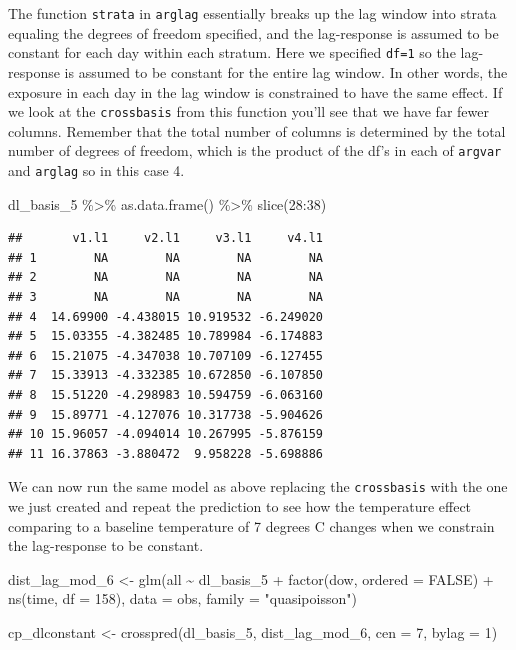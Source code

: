 \documentclass[
]{book}
\newenvironment{Shaded}{\begin{snugshade}}{\end{snugshade}}
\newcommand{\AttributeTok}[1]{\textcolor[rgb]{0.77,0.63,0.00}{#1}}
\newcommand{\ConstantTok}[1]{\textcolor[rgb]{0.00,0.00,0.00}{#1}}
\newcommand{\DecValTok}[1]{\textcolor[rgb]{0.00,0.00,0.81}{#1}}
\newcommand{\FunctionTok}[1]{\textcolor[rgb]{0.00,0.00,0.00}{#1}}
\newcommand{\NormalTok}[1]{#1}
\newcommand{\OtherTok}[1]{\textcolor[rgb]{0.56,0.35,0.01}{#1}}
\newcommand{\SpecialCharTok}[1]{\textcolor[rgb]{0.00,0.00,0.00}{#1}}
\newcommand{\StringTok}[1]{\textcolor[rgb]{0.31,0.60,0.02}{#1}}
\begin{document}
The function \texttt{strata} in \texttt{arglag} essentially breaks up the lag window into strata equaling the degrees of freedom specified, and the lag-response is assumed to be constant for each day within each stratum. Here we specified \texttt{df=1} so the lag-response is assumed to be constant for the entire lag window. In other words, the exposure in each day in the lag window is constrained to have the same effect. If we look at the \texttt{crossbasis} from this function you'll see that we have far fewer columns. Remember that the total number of columns is determined by the total number of degrees of freedom, which is the product of the df's in each of \texttt{argvar} and \texttt{arglag} so in this case 4.

\begin{Shaded}
\begin{Highlighting}[]
\NormalTok{dl\_basis\_5 }\SpecialCharTok{\%\textgreater{}\%} 
  \FunctionTok{as.data.frame}\NormalTok{() }\SpecialCharTok{\%\textgreater{}\%} 
  \FunctionTok{slice}\NormalTok{(}\DecValTok{28}\SpecialCharTok{:}\DecValTok{38}\NormalTok{)}
\end{Highlighting}
\end{Shaded}

\begin{verbatim}
##       v1.l1     v2.l1     v3.l1     v4.l1
## 1        NA        NA        NA        NA
## 2        NA        NA        NA        NA
## 3        NA        NA        NA        NA
## 4  14.69900 -4.438015 10.919532 -6.249020
## 5  15.03355 -4.382485 10.789984 -6.174883
## 6  15.21075 -4.347038 10.707109 -6.127455
## 7  15.33913 -4.332385 10.672850 -6.107850
## 8  15.51220 -4.298983 10.594759 -6.063160
## 9  15.89771 -4.127076 10.317738 -5.904626
## 10 15.96057 -4.094014 10.267995 -5.876159
## 11 16.37863 -3.880472  9.958228 -5.698886
\end{verbatim}

We can now run the same model as above replacing the \texttt{crossbasis} with the one we just created and
repeat the prediction to see how the temperature effect comparing to a baseline temperature
of 7 degrees C changes when we constrain the lag-response to be constant.

\begin{Shaded}
\begin{Highlighting}[]
\NormalTok{dist\_lag\_mod\_6 }\OtherTok{\textless{}{-}} \FunctionTok{glm}\NormalTok{(all }\SpecialCharTok{\textasciitilde{}}\NormalTok{ dl\_basis\_5 }\SpecialCharTok{+} 
                        \FunctionTok{factor}\NormalTok{(dow, }\AttributeTok{ordered =} \ConstantTok{FALSE}\NormalTok{) }\SpecialCharTok{+}
                          \FunctionTok{ns}\NormalTok{(time, }\AttributeTok{df =} \DecValTok{158}\NormalTok{), }
                        \AttributeTok{data =}\NormalTok{ obs, }\AttributeTok{family =} \StringTok{"quasipoisson"}\NormalTok{)}

\NormalTok{cp\_dlconstant }\OtherTok{\textless{}{-}} \FunctionTok{crosspred}\NormalTok{(dl\_basis\_5, dist\_lag\_mod\_6, }\AttributeTok{cen =} \DecValTok{7}\NormalTok{, }\AttributeTok{bylag =} \DecValTok{1}\NormalTok{)}
\end{Highlighting}
\end{Shaded}
\end{document}
